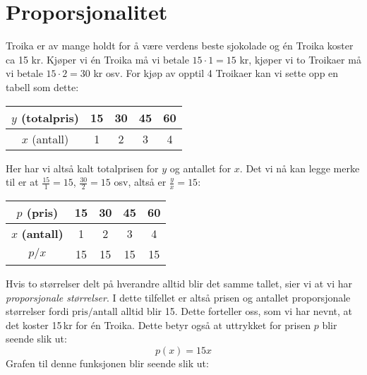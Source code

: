 \section{Proporsjonalitet}
Troika er av mange holdt for å være verdens beste sjokolade og én Troika koster ca 15 kr. Kjøper vi én Troika må vi betale $ {15\cdot1 =15}$ kr, kjøper vi to Troikaer må vi betale $ {15\cdot2=30 }$ kr osv. For kjøp av opptil 4 Troikaer kan vi sette opp en tabell som dette:
\begin{center}
	\begin{tabular}{|c|c|c|c|c|}
		\hline 
		$ y $ (totalpris) & 15 & 30 & 45 & 60 \\ \hline 
		$ x $ (antall) & 1 & 2 & 3 & 4 \\ \hline 
	\end{tabular}
\end{center}
Her har vi altså kalt totalprisen for $ y $ og antallet for $ x $. Det vi nå kan legge merke til er at $ {\frac{15}{1}=15} $,  $ {\frac{30}{2}=15} $ osv, altså er $ \frac{y}{x}=15 $:
\begin{center}
	\begin{tabular}{|c|c|c|c|c|}
		\hline 
		\boldmath$ p $ \textbf{(pris)} & 15 & 30 & 45 & 60 \\ \hline 
		\boldmath$ x $ \textbf{(antall)} & 1 & 2 & 3 & 4 \\ \hline 
	  \boldmath $ p/x $  & 15 & 15 & 15 &15 \\ \hline 
	\end{tabular}
\end{center}
Hvis to størrelser delt på hverandre alltid blir det samme tallet, sier vi at vi har \textit{proporsjonale størrelser}. I dette tilfellet er altså prisen og antallet proporsjonale størrelser fordi $ \text{pris}/\text{antall} $ alltid blir 15. Dette forteller oss, som vi har nevnt, at det koster 15\,kr for én Troika. Dette betyr også at uttrykket for prisen $ p $ blir seende slik ut:
\[ p(x) = 15x \]
Grafen til denne funksjonen blir seende slik ut:

